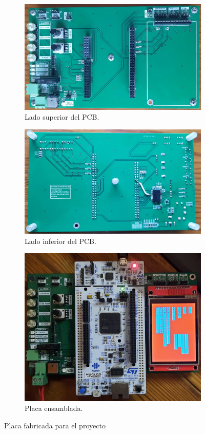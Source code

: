 \begin{figure}[H]
     \centering
     \begin{subfigure}{\textwidth}
         \centering
         \includegraphics[width=.65\textwidth]{./Figures/placa2.jpg}
         \caption{Lado superior del PCB.}
         \label{fig:placa1}
     \end{subfigure}
     \begin{subfigure}{\textwidth}
         \centering
         \includegraphics[width=.65\textwidth]{./Figures/placa3.jpg}
         \caption{Lado inferior del PCB.}
         \label{fig:placa2}
     \end{subfigure}
     \begin{subfigure}{\textwidth}
         \centering
         \includegraphics[width=.65\textwidth]{./Figures/placa1.jpg}
         \caption{Placa ensamblada.}
         \label{fig:placa3}
     \end{subfigure}
        \caption{Placa fabricada para el proyecto}
        \label{fig:three graphs}
\end{figure}

